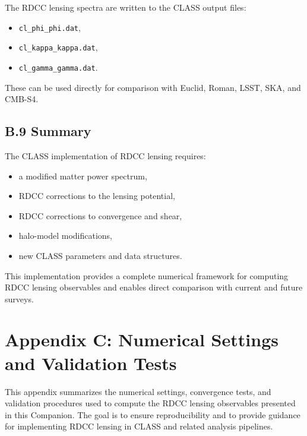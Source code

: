 \documentclass[11pt,a4paper]{article}
\begin{document}
The RDCC lensing spectra are written to the CLASS output files:

\begin{itemize}
\item \texttt{cl\_phi\_phi.dat},
\item \texttt{cl\_kappa\_kappa.dat},
\item \texttt{cl\_gamma\_gamma.dat}.
\end{itemize}

These can be used directly for comparison with Euclid, Roman, LSST, SKA, and CMB-S4.

\subsection*{B.9 Summary}

The CLASS implementation of RDCC lensing requires:

\begin{itemize}
\item a modified matter power spectrum,
\item RDCC corrections to the lensing potential,
\item RDCC corrections to convergence and shear,
\item halo-model modifications,
\item new CLASS parameters and data structures.
\end{itemize}

This implementation provides a complete numerical framework for computing RDCC lensing
observables and enables direct comparison with current and future surveys.

\section*{Appendix C: Numerical Settings and Validation Tests}

This appendix summarizes the numerical settings, convergence tests, and validation procedures
used to compute the RDCC lensing observables presented in this Companion. The goal is to
ensure reproducibility and to provide guidance for implementing RDCC lensing in CLASS and
related analysis pipelines.
\end{document}
